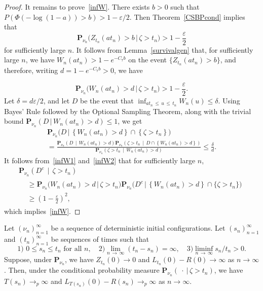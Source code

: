 \documentclass[AHL,Unicode,longabstracts,published]{cedram}
\newcommand*\eps{\varepsilon}
\renewcommand*\P{\mathbf{P}}
\newcommand{\1} {\mathds{1}}
\begin{document}
\begin{proof}
It remains to prove~\eqref{infW}. There exists $b > 0$ such that $P(\Phi(-\log(1-a)) > b) > 1 - \eps/2$. Then Theorem~\ref{CSBPcond} implies that
\[
\P_{\nu_n}\big(Z_{t_n}(a t_n) > b \,\big|\, \zeta > t_n\big) > 1 - \frac{\eps}{2}
\]
for sufficiently large $n$. It follows from Lemma~\ref{survivalgen} that, for sufficiently large $n$, we have $W_n(at_n) > 1 - e^{-C_7 b}$ on the event $\{Z_{t_n}(at_n) > b\}$, and therefore, writing $d = 1 - e^{-C_7 b} > 0$, we have

\begin{equation}\label{infW1}
\P_{\nu_n}\big(W_n(at_n) > d \,\big|\, \zeta > t_n\big) > 1 - \frac{\eps}{2}.
\end{equation}
Let $\delta = d \eps/2$, and let $D$ be the event that $\inf_{at_n\,\leq\,u\,\leq\,t_n} W_n(u) \leq \delta$. Using Bayes' Rule followed by the Optional Sampling Theorem, along with the trivial bound $\P_{\nu_n}(D \,|\, W_n(at_n) > d) \leq 1$, we get
\begin{multline}\label{infW2}
\P_{\nu_n} \big(D \,\big|\, \left\{W_n(at_n) > d\right\} \cap \left\{\zeta > t_n\right\}\big)\\
= \frac{\P_{\nu_n}\left(D \,\middle|\, W_n(at_n) > d\right) \P_{\nu_n}\left(\zeta > t_n\,\middle|\, D \cap \left\{W_n(at_n) > d\right\}\right)}{\P_{\nu_n}\left(\zeta > t_n\,\middle|\,W_n(at_n) > d\right)}
\leq \frac{\delta}{d}.
\end{multline}
It follows from~\eqref{infW1} and~\eqref{infW2} that for sufficiently large $n$,
\begin{multline*}
\P_{\nu_n}\left(D^c\,\middle|\,\zeta > t_n\right)\\
\begin{aligned}
&\geq \P_{\nu_n}\big(W_n(at_n) > d\,\big|\,\zeta > t_n\big) \P_{\nu_n}\big(D^c\,\big|\,\left\{W_n(at_n) > d\right\} \cap \{\zeta > t_n\}\big) \\
&\geq \left(1 - \frac{\eps}{2} \right)^2,
\end{aligned}
\end{multline*}
which implies~\eqref{infW}.
\end{proof}

\begin{lemm}\label{gensequence}
Let $(\nu_n)_{n=1}^{\infty}$ be a sequence of deterministic initial configurations. Let $(s_n)_{n=1}^{\infty}$ and $(t_n)_{n=1}^{\infty}$ be sequences of times such that
\begin{equation}\label{sntn2}
\text{1) } 0 \leq s_n \leq t_n \text{ for all } n, \quad\text{2)} \lim_{n\,\rightarrow\, \infty} (t_n - s_n) = \infty, \quad\text{3)}\liminf_{n\,\rightarrow\,\infty} s_n/t_n > 0.
\end{equation}
Suppose, under $\P_{\nu_n}$, we have $Z_{t_n}(0) \rightarrow 0$ and $L_{t_n}(0) - R(0) \rightarrow \infty$ as $n \rightarrow \infty$. Then, under the conditional probability measure $\P_{\nu_n}(\: \cdot \:|\,\zeta > t_n)$, we have $T(s_n) \rightarrow_p \infty$ and $L_{T(s_n)}(0) - R(s_n) \rightarrow_p \infty$ as $n \rightarrow \infty$.
\end{lemm}
\end{document}
